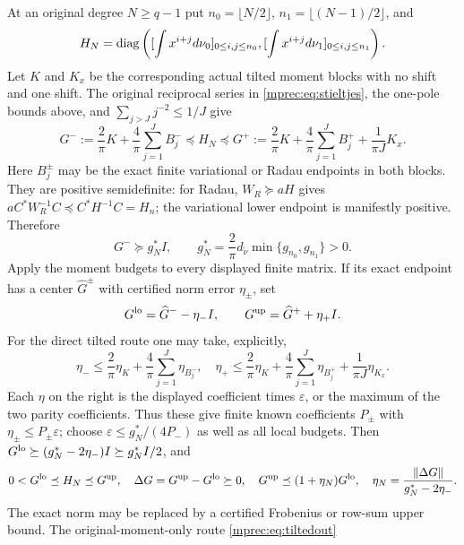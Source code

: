 At an original degree $N\ge q-1$ put
$n_0=\lfloor N/2\rfloor$, $n_1=\lfloor(N-1)/2\rfloor$, and
\[
 H_N=\operatorname{diag}\left([\int x^{i+j}d\nu_0]_{0\le i,j\le n_0},
                [\int x^{i+j}d\nu_1]_{0\le i,j\le n_1}\right).
\]
Let $K$ and $K_x$ be the corresponding actual tilted moment
blocks with no shift and one shift. The original reciprocal series
in \eqref{mprec:eq:stieltjes}, the one-pole bounds above, and
$\sum_{j>J}j^{-2}\le1/J$ give
\begin{equation}\label{mprec:eq:Gexact}
 G^-:=\frac2\pi K+\frac4\pi\sum_{j=1}^JB_j^-
 \preceq H_N\preceq
 G^+:=\frac2\pi K+\frac4\pi\sum_{j=1}^JB_j^+
                        +\frac1{\pi J}K_x.
\end{equation}
Here $B_j^\pm$ may be the exact finite variational or Radau
endpoints in both blocks. They are positive semidefinite: for
Radau, $W_R\succeq aH$ gives
$aC^*W_R^{-1}C\preceq C^*H^{-1}C=H_n$; the variational
lower endpoint is manifestly positive. Therefore
\begin{equation}\label{mprec:eq:gsource}
 G^-\succeq g_N^*I,\qquad
 g_N^*=\frac2\pi d_{\widetilde\nu}
                         \min\{g_{n_0},g_{n_1}\}>0.
\end{equation}
Apply the moment budgets to every displayed finite matrix. If
its exact endpoint has a center $\widehat G^\pm$ with certified
norm error $\eta_\pm$, set
\begin{equation}\label{mprec:eq:Gout}
 G^{\rm lo}=\widehat G^--\eta_-I,\qquad
 G^{\rm up}=\widehat G^++\eta_+I.
\end{equation}
For the direct tilted route one may take, explicitly,
\[
 \eta_-\le\frac2\pi\eta_K+\frac4\pi\sum_{j=1}^J\eta_{B_j^-},
 \quad
 \eta_+\le\frac2\pi\eta_K+\frac4\pi\sum_{j=1}^J\eta_{B_j^+}
                         +\frac1{\pi J}\eta_{K_x}.
\]
Each $\eta$ on the right is the displayed coefficient times
$\varepsilon$, or the maximum of the two parity coefficients.
Thus these give finite known coefficients $P_\pm$ with
$\eta_\pm\le P_\pm\varepsilon$; choose
$\varepsilon\le g_N^*/(4P_-)$ as well as all local budgets.
Then $G^{\rm lo}\succeq(g_N^*-2\eta_-)I\succeq g_N^*I/2$,
and
\begin{equation}\label{mprec:eq:sourcecert}
 0<G^{\rm lo}\preceq H_N\preceq G^{\rm up},\quad
 \Delta G=G^{\rm up}-G^{\rm lo}\succeq0,\quad
 G^{\rm up}\preceq(1+\eta_N)G^{\rm lo},\quad
 \eta_N=\frac{\left\lVert\Delta G\right\rVert}{g_N^*-2\eta_-}.
\end{equation}
The exact norm may be replaced by a certified Frobenius or row-sum
upper bound. The original-moment-only route \eqref{mprec:eq:tiltedout}
